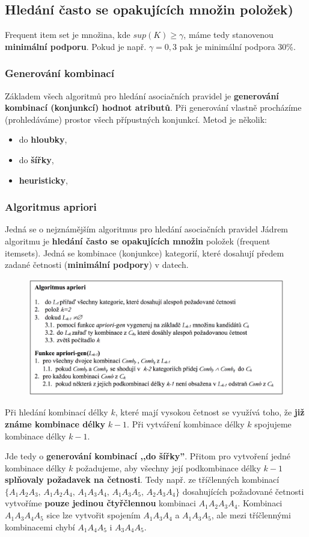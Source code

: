 \subsection{Hledání často se opakujících množin položek)}
Frequent item set je množina, kde $sup(K) \geq \gamma$, máme tedy stanovenou \textbf{minimální podporu}. Pokud je např. $\gamma = 0,3$ pak je minimální podpora 30\%.

\subsubsection{Generování kombinací}
Základem všech algoritmů pro hledání asociačních pravidel je \textbf{generování kombinací (konjunkcí) hodnot atributů}. Při generování vlastně procházíme (prohledáváme) prostor všech přípustných konjunkcí. Metod je několik:
\begin{itemize}
\item do \textbf{hloubky},
\item do \textbf{šířky},
\item \textbf{heuristicky},
\end{itemize}

\subsubsection{Algoritmus apriori}
Jedná se o nejznámějším algoritmus pro hledání asociačních pravidel Jádrem algoritmu je \textbf{hledání často se opakujících množin} položek (frequent itemsets). Jedná se kombinace (konjunkce) kategorií, které dosahují předem zadané četnosti (\textbf{minimální podpory}) v datech.

\begin{figure}[H]
	\centering
	\includegraphics[width=\textwidth]{assets/apriori.png}
\end{figure}

Při hledání kombinací délky $ k $, které mají vysokou četnost se využívá toho, že \textbf{již známe kombinace délky} $ k-1 $. Při vytváření kombinace délky $ k $ spojujeme kombinace délky $ k-1 $.

Jde tedy o \textbf{generování kombinací ,,do šířky''}. Přitom pro vytvoření jedné kombinace délky $ k $ požadujeme, aby všechny její podkombinace délky $ k-1 $ \textbf{splňovaly požadavek na četnosti}. Tedy např. ze tříčlenných kombinací $\{A_1A_2A_3,  \,A_1A_2A_4, \, A_1A_3A_4, \,A_1A_3A_5,  \,A_2A_3A_4\}$ dosahujících požadované četnosti vytvoříme \textbf{pouze jedinou čtyřčlennou} kombinaci $ A_1A_2A_3A_4 $. Kombinaci $ A_1A_3A_4A_5 $ sice lze vytvořit spojením $ A_1A_3A_4 $ a
$ A_1A_3A_5 $, ale mezi tříčlennými kombinacemi chybí $ A_1A_4A_5 $ i $ A_3A_4A_5 $.
